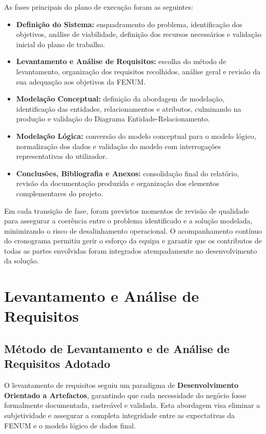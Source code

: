 \documentclass[12pt,a4paper]{article}
\begin{document}
As fases principais do plano de execução foram as seguintes:

\begin{itemize}[leftmargin=1.5cm]
    \item \textbf{Definição do Sistema:} enquadramento do problema,
    identificação dos objetivos, análise de viabilidade, definição dos recursos
    necessários e validação inicial do plano de trabalho.
    \item \textbf{Levantamento e Análise de Requisitos:} escolha do método de
    levantamento, organização dos requisitos recolhidos, análise geral e revisão
    da sua adequação aos objetivos da FENUM.
    \item \textbf{Modelação Conceptual:} definição da abordagem de modelação,
    identificação das entidades, relacionamentos e atributos, culminando na
    produção e validação do Diagrama Entidade-Relacionamento.
    \item \textbf{Modelação Lógica:} conversão do modelo conceptual para o
    modelo lógico, normalização dos dados e validação do modelo com interrogações
    representativas do utilizador.
    \item \textbf{Conclusões, Bibliografia e Anexos:} consolidação final do
    relatório, revisão da documentação produzida e organização dos elementos
    complementares do projeto.
\end{itemize}

Em cada transição de fase, foram previstos momentos de revisão de qualidade para
assegurar a coerência entre o problema identificado e a solução modelada,
minimizando o risco de desalinhamento operacional. O acompanhamento contínuo do
cronograma permitiu gerir o esforço da equipa e garantir que os contributos de
todas as partes envolvidas foram integrados atempadamente no desenvolvimento da
solução.

\section{Levantamento e Análise de Requisitos}

\subsection{Método de Levantamento e de Análise de Requisitos Adotado}

O levantamento de requisitos seguiu um paradigma de \textbf{Desenvolvimento
Orientado a Artefactos}, garantindo que cada necessidade do negócio fosse
formalmente documentada, rastreável e validada. Esta abordagem visa eliminar a
subjetividade e assegurar a completa integridade entre as expectativas da FENUM
e o modelo lógico de dados final.
\end{document}
